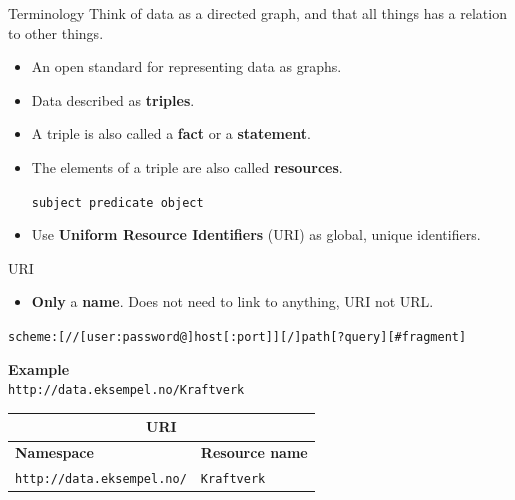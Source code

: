 \documentclass{dt}
\begin{document}
\begin{frame}{Terminology}
Think of data as a directed graph, and that all things has a relation to other things.

\begin{itemize}
\item An open standard for representing data as graphs.
\begin{center}
\end{center}
\item Data described as \textbf{triples}.
\item A triple is also called a \textbf{fact} or a \textbf{statement}.
\item The elements of a triple are also called \textbf{resources}.
\begin{center}
\texttt{subject predicate object}
\end{center}
\item Use \textbf{Uniform Resource Identifiers} (URI) as global, unique identifiers.
\end{itemize}
\end{frame}

\begin{frame}{URI}
\begin{itemize}
\item
\textbf{Only} a \textbf{name}. Does not need to link to anything, URI not URL.
\end{itemize}

\begin{center}
\small{\texttt{scheme:[//[user:password@]host[:port]][/]path[?query][\#fragment]}}
\end{center}

\vspace{10pt}

\textbf{Example}\\
\texttt{http://data.eksempel.no/Kraftverk}

\vspace{10pt}

\begin{tabular}{|l|l|}
\hline
\multicolumn{2}{|c|}{\textbf{URI}}\\
\hline
\textbf{Namespace}&\textbf{Resource name}\\
\hline
\texttt{http://data.eksempel.no/}&\texttt{Kraftverk}\\
\hline
\end{tabular}
\end{frame}
\end{document}
